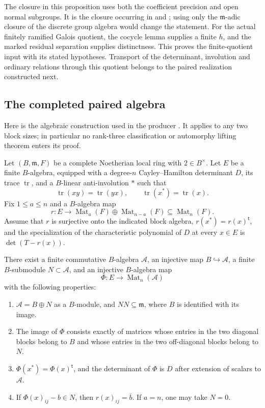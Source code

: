 The closure in this proposition uses both the coefficient precision
and open normal subgroups. It is the closure occurring in
 and ;
using only the \(\mathfrak m\)-adic closure of the discrete group algebra
would change the statement.
For the actual finitely ramified Galois quotient, the cocycle lemma
supplies a finite \(h\), and the marked residual separation supplies
distinctness. This proves the finite-quotient input with its stated
hypotheses. Transport of the determinant, involution and ordinary
relations through this quotient belongs to the paired realization
constructed next.

\subsection{The completed paired algebra}
\label{sec:completed-paired-algebra}

Here is the algebraic construction used in the producer
.  It applies to any two block sizes; in
particular no rank-three classification or automorphy lifting theorem
enters its proof.

\begin{srproposition}
\label{prop:paired-ch-realization}
Let $(B,\mathfrak m,F)$ be a complete Noetherian local ring with $2\in
B^\times$.  Let $E$ be a finite $B$-algebra, equipped with a degree-$n$
Cayley--Hamilton determinant $D$, its trace $\operatorname{tr}$, and a
$B$-linear anti-involution $*$ such that
\[
 \operatorname{tr}(xy)=\operatorname{tr}(yx),\qquad
 \operatorname{tr}(x^*)=\operatorname{tr}(x).
\]
Fix $1\leq a\leq n$ and a $B$-algebra map
\[
 r:E\longrightarrow
 \operatorname{Mat}_a(F)\oplus\operatorname{Mat}_{n-a}(F)
 \subseteq\operatorname{Mat}_n(F).
\]
Assume that $r$ is surjective onto the indicated block algebra,
$r(x^*)=r(x)^{\mathsf t}$, and the specialization of the characteristic
polynomial of $D$ at every $x\in E$ is $\det(T-r(x))$.

There exist a finite commutative $B$-algebra $\mathcal A$, an injective
map $B\hookrightarrow\mathcal A$, a finite $B$-submodule $N\subset
\mathcal A$, and an injective $B$-algebra map
\[
 \Phi:E\longrightarrow\operatorname{Mat}_n(\mathcal A)
\]
with the following properties:
\begin{enumerate}
\item $\mathcal A=B\oplus N$ as a $B$-module, and $NN\subseteq\mathfrak m$,
where $B$ is identified with its image.
\item The image of $\Phi$ consists exactly of matrices whose entries in
the two diagonal blocks belong to $B$ and whose entries in the two
off-diagonal blocks belong to $N$.
\item $\Phi(x^*)=\Phi(x)^{\mathsf t}$, and the determinant of $\Phi$ is
$D$ after extension of scalars to $\mathcal A$.
\item If $\Phi(x)_{ij}-b\in N$, then $r(x)_{ij}=\overline b$.
If $a=n$, one may take $N=0$.
\end{enumerate}
\end{srproposition}

